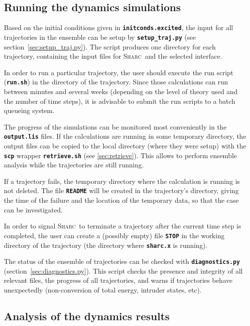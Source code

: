\documentclass[a4paper,10pt,DIV=15,openany,twoside=false]{scrbook}
\newcommand{\sharc}{\textsc{Sharc}}
\newcommand{\ttt}[1]{\textbf{\texttt{#1}}}
\begin{document}
\subsection{Running the dynamics simulations}

Based on the initial conditions given in \ttt{initconds.excited}, the input for all trajectories in the ensemble can be setup by \ttt{setup\_traj.py} (see section~\ref{sec:setup_traj.py}). The script produces one directory for each trajectory, containing the input files for \sharc\ and the selected interface.

In order to run a particular trajectory, the user should execute the run script (\ttt{run.sh}) in the directory of the trajectory. Since those calculations can run between minutes and several weeks (depending on the level of theory used and the number of time steps), it is advisable to submit the run scripts to a batch queueing system. 

The progress of the simulations can be monitored most conveniently in the \ttt{output.lis} files. If the calculations are running in some temporary directory, the output files can be copied to the local directory (where they were setup) with the \ttt{scp} wrapper \ttt{retrieve.sh} (see \ref{sec:retrieve}). This allows to perform ensemble analysis while the trajectories are still running.

If a trajectory fails, the temporary directory where the calculation is running is not deleted. The file \ttt{README} will be created in the trajectory's directory, giving the time of the failure and the location of the temporary data, so that the case can be investigated. 

In order to signal \sharc\ to terminate a trajectory after the current time step is completed, the user can create a (possibly empty) file \ttt{STOP} in the working directory of the trajectory (the directory where \ttt{sharc.x} is running).

The status of the ensemble of trajectories can be checked with \ttt{diagnostics.py} (section~\ref{sec:diagnostics.py}). This script checks the presence and integrity of all relevant files, the progress of all trajectories, and warns if trajectories behave unexpectedly (non-conversion of total energy, intruder states, etc).

\subsection{Analysis of the dynamics results}
\end{document}
